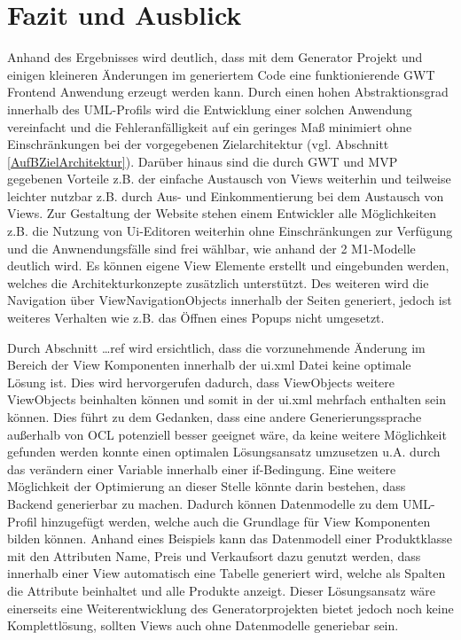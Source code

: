 \chapter{Fazit und Ausblick}
\label{FazitAusblick}
Anhand des Ergebnisses wird deutlich, dass mit dem Generator Projekt und einigen
kleineren Änderungen im generiertem Code eine funktionierende GWT Frontend
Anwendung erzeugt werden kann. Durch einen
hohen Abstraktionsgrad innerhalb des UML-Profils wird die Entwicklung einer solchen Anwendung 
vereinfacht und die Fehleranfälligkeit auf ein geringes Maß minimiert ohne
Einschränkungen bei der vorgegebenen Zielarchitektur (vgl. Abschnitt
\ref{AufBZielArchitektur}).
Darüber hinaus sind die durch GWT und MVP gegebenen Vorteile z.B. der
einfache Austausch von Views weiterhin und teilweise leichter nutzbar z.B.
durch Aus- und Einkommentierung bei dem Austausch von Views. Zur Gestaltung der
Website stehen einem Entwickler alle Möglichkeiten z.B. die
Nutzung von Ui-Editoren weiterhin ohne Einschränkungen zur Verfügung und die
Anwnendungsfälle sind frei wählbar, wie anhand der 2 M1-Modelle deutlich wird.
Es können eigene View Elemente erstellt und eingebunden werden, welches die
Architekturkonzepte zusätzlich unterstützt. Des weiteren wird die Navigation
über ViewNavigationObjects innerhalb der Seiten generiert, jedoch ist weiteres
Verhalten wie z.B. das Öffnen eines Popups nicht umgesetzt.

Durch Abschnitt \ldots ref wird ersichtlich, dass die vorzunehmende Änderung im
Bereich der View Komponenten innerhalb der ui.xml Datei keine optimale Lösung ist. Dies wird hervorgerufen
dadurch, dass ViewObjects weitere ViewObjects beinhalten können und somit in der
ui.xml mehrfach enthalten sein können. Dies führt zu dem Gedanken, dass eine
andere Generierungssprache außerhalb von OCL potenziell besser geeignet wäre, da
keine weitere Möglichkeit gefunden werden konnte einen optimalen Lösungsansatz
umzusetzen u.A. durch das verändern einer Variable innerhalb einer if-Bedingung.
Eine weitere Möglichkeit der Optimierung an dieser Stelle könnte darin bestehen,
dass Backend generierbar zu machen. Dadurch können Datenmodelle zu dem
UML-Profil hinzugefügt werden, welche auch die Grundlage für View Komponenten
bilden können. Anhand eines
Beispiels kann das Datenmodell einer Produktklasse mit den Attributen Name,
Preis und Verkaufsort dazu genutzt werden, dass innerhalb einer View automatisch
eine Tabelle generiert wird, welche als Spalten die Attribute beinhaltet und
alle Produkte anzeigt. Dieser Lösungsansatz wäre einerseits eine
Weiterentwicklung des Generatorprojekten bietet jedoch noch keine Komplettlösung, sollten Views auch
ohne Datenmodelle generiebar sein.

